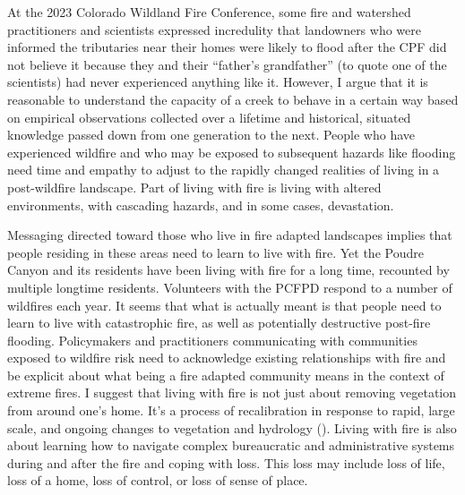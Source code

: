 \documentclass[
]{article}
\begin{document}
At the 2023 Colorado Wildland Fire Conference, some fire and watershed practitioners and scientists expressed incredulity that landowners who were informed the tributaries near their homes were likely to flood after the CPF did not believe it because they and their ``father's grandfather'' (to quote one of the scientists) had never experienced anything like it. However, I argue that it is reasonable to understand the capacity of a creek to behave in a certain way based on empirical observations collected over a lifetime and historical, situated knowledge passed down from one generation to the next. People who have experienced wildfire and who may be exposed to subsequent hazards like flooding need time and empathy to adjust to the rapidly changed realities of living in a post-wildfire landscape. Part of living with fire is living with altered environments, with cascading hazards, and in some cases, devastation.

Messaging directed toward those who live in fire adapted landscapes implies that people residing in these areas need to learn to live with fire. Yet the Poudre Canyon and its residents have been living with fire for a long time, recounted by multiple longtime residents. Volunteers with the PCFPD respond to a number of wildfires each year. It seems that what is actually meant is that people need to learn to live with catastrophic fire, as well as potentially destructive post-fire flooding. Policymakers and practitioners communicating with communities exposed to wildfire risk need to acknowledge existing relationships with fire and be explicit about what being a fire adapted community means in the context of extreme fires. I suggest that living with fire is not just about removing vegetation from around one's home. It's a process of recalibration in response to rapid, large scale, and ongoing changes to vegetation and hydrology (). Living with fire is also about learning how to navigate complex bureaucratic and administrative systems during and after the fire and coping with loss. This loss may include loss of life, loss of a home, loss of control, or loss of sense of place.
\end{document}
